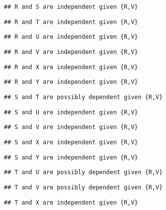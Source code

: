 \documentclass[
]{article}
\begin{document}
\begin{verbatim}
## R and S are independent given {R,V}
\end{verbatim}

\begin{verbatim}
## R and T are independent given {R,V}
\end{verbatim}

\begin{verbatim}
## R and U are independent given {R,V}
\end{verbatim}

\begin{verbatim}
## R and V are independent given {R,V}
\end{verbatim}

\begin{verbatim}
## R and X are independent given {R,V}
\end{verbatim}

\begin{verbatim}
## R and Y are independent given {R,V}
\end{verbatim}

\begin{verbatim}
## S and T are possibly dependent given {R,V}
\end{verbatim}

\begin{verbatim}
## S and U are independent given {R,V}
\end{verbatim}

\begin{verbatim}
## S and V are independent given {R,V}
\end{verbatim}

\begin{verbatim}
## S and X are independent given {R,V}
\end{verbatim}

\begin{verbatim}
## S and Y are independent given {R,V}
\end{verbatim}

\begin{verbatim}
## T and U are possibly dependent given {R,V}
\end{verbatim}

\begin{verbatim}
## T and V are possibly dependent given {R,V}
\end{verbatim}

\begin{verbatim}
## T and X are independent given {R,V}
\end{verbatim}
\end{document}
